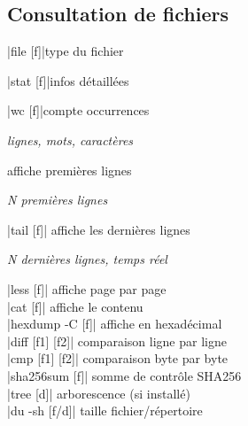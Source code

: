 \documentclass{article}
\newenvironment{cmdblock}{%
  \par\setlength{\parindent}{0pt}\setlength{\parskip}{0pt}%
  \RaggedRight%
}{\par}
\newlength{\cmdoptindent}
\newcommand{\cmdopt}[1]{%
  \hspace*{\cmdoptindent}%
  \begin{minipage}[t]{\dimexpr\linewidth-\cmdoptindent\relax}
    \RaggedRight \itshape #1%
  \end{minipage}\par
}
\begin{document}
\begin{multicols}{4}
    \section*{Consultation de fichiers}
    \begin{cmdblock}
        \code|file [f]|\quad type du fichier\par
        \code|stat [f]|\quad infos détaillées\par
        \code|wc [f]|\quad compte occurrences\par
        \cmdopt{ lignes,  mots,  caractères}
        \quad affiche premières lignes\par
        \cmdopt{ N premières lignes}
        \code|tail [f]| \quad affiche les dernières lignes \\
        \cmdopt{ N dernières lignes,
             temps réel}
        \code|less [f]| \quad affiche page par page \\
        \code|cat [f]| \quad affiche le contenu \\
        \code|hexdump -C [f]| \quad affiche en hexadécimal \\
        \code|diff [f1] [f2]| \quad comparaison ligne par ligne \\
        \code|cmp [f1] [f2]| \quad comparaison byte par byte \\
        \code|sha256sum [f]| \quad somme de contrôle SHA256 \\
        \code|tree [d]| \quad arborescence (si installé) \\
        \code|du -sh [f/d]| \quad taille fichier/répertoire \\
    \end{cmdblock}


\end{multicols}
\end{document}

